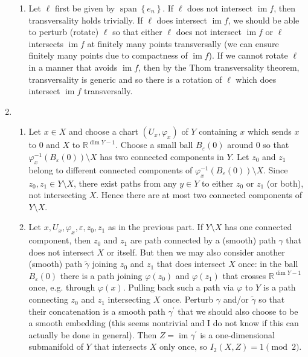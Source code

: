\documentclass[11pt,leqno]{article}
\theoremstyle{plain}
\theoremstyle{definition}
\numberwithin{equation}{section}
\numberwithin{lem}{section}
\newcommand{\cbr}[1]{\left\{#1\right\}}
\DeclareMathOperator{\Span}{span}
\DeclareMathOperator{\im}{im}
\begin{document}
\begin{enumerate}
\begin{enumerate}
      \item Let $\ell$ first be given by $\Span\cbr{e_n}$. If $\ell$ does not intersect $\im f$, then transversality holds trivially. If $\ell$ does intersect $\im f$, we should be able to perturb (rotate) $\ell$ so that either $\ell$ does not intersect $\im f$ or $\ell$ intersects $\im f$ at finitely many points transversally (we can ensure finitely many points due to compactness of $\im f$). If we cannot rotate $\ell$ in a manner that avoids $\im f$, then by the Thom transversality theorem, transversality is generic and so there is a rotation of $\ell$ which does intersect $\im f$ transversally.
    \end{enumerate}
    \item \begin{enumerate}
      \item Let $x\in X$ and choose a chart $(U_x,\varphi_x)$ of $Y$ containing $x$ which sends $x$ to $0$ and $X$ to $\mathbb R^{\dim Y-1}$. Choose a small ball $B_\varepsilon(0)$ around $0$ so that $\varphi_x^{-1}(B_\varepsilon(0))\setminus X$ has two connected components in $Y$. Let $z_0$ and $z_1$ belong to different connected components of $\varphi_x^{-1}(B_\varepsilon(0))\setminus X$. Since $z_0,z_1\in Y\setminus X$, there exist paths from any $y\in Y$ to either $z_0$ or $z_1$ (or both), not intersecting $X$. Hence there are at most two connected components of $Y\setminus X$.
      \item Let $x,U_x,\varphi_x,\varepsilon,z_0,z_1$ as in the previous part. If $Y\setminus X$ has one connected component, then $z_0$ and $z_1$ are path connected by a (smooth) path $\gamma$ that does not intersect $X$ or itself. But then we may also consider another (smooth) path $\tilde\gamma$ joining $z_0$ and $z_1$ that does intersect $X$ once: in the ball $B_\varepsilon(0)$ there is a path joining $\varphi(z_0)$ and $\varphi(z_1)$ that crosses $\mathbb R^{\dim Y-1}$ once, e.g. through $\varphi(x)$. Pulling back such a path via $\varphi$ to $Y$ is a path connecting $z_0$ and $z_1$ intersecting $X$ once. Perturb $\gamma$ and/or $\tilde\gamma$ so that their concatenation is a smooth path $\gamma^\prime$ that we should also choose to be a smooth embedding (this seems nontrivial and I do not know if this can actually be done in general). Then $Z = \im \gamma^\prime$ is a one-dimensional submanifold of $Y$ that intersects $X$ only once, so $I_2(X,Z) = 1\pmod 2$.

\end{enumerate}
\end{enumerate}
\end{document}
